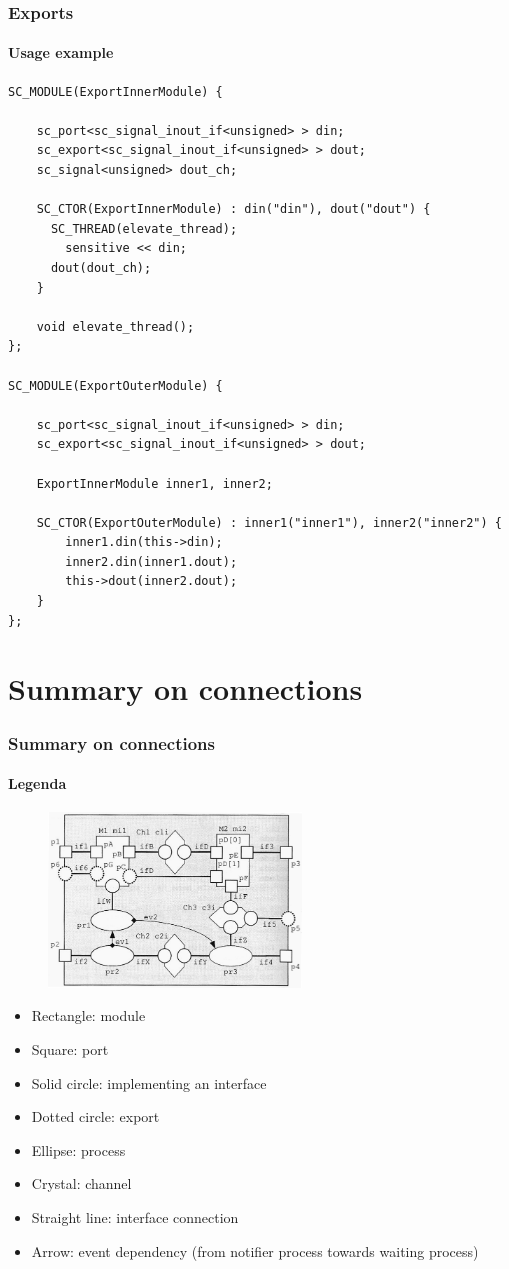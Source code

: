 \begin{frame}[fragile]
\frametitle{Exports}
\framesubtitle{Usage example}
{\tiny 
\begin{verbatim}
SC_MODULE(ExportInnerModule) {

    sc_port<sc_signal_inout_if<unsigned> > din;
    sc_export<sc_signal_inout_if<unsigned> > dout;
    sc_signal<unsigned> dout_ch;

    SC_CTOR(ExportInnerModule) : din("din"), dout("dout") {
      SC_THREAD(elevate_thread);
        sensitive << din;
      dout(dout_ch);
    }
    
    void elevate_thread();
};

SC_MODULE(ExportOuterModule) {

    sc_port<sc_signal_inout_if<unsigned> > din;
    sc_export<sc_signal_inout_if<unsigned> > dout;
    
    ExportInnerModule inner1, inner2;
    
    SC_CTOR(ExportOuterModule) : inner1("inner1"), inner2("inner2") {
        inner1.din(this->din);
        inner2.din(inner1.dout);
        this->dout(inner2.dout);
    }
};
\end{verbatim}
}
\end{frame}

\section{Summary on connections}

\begin{frame}
\frametitle{Summary on connections}
\framesubtitle{Legenda}

\begin{figure}
\includegraphics[width=0.6\textwidth]{lecture12/img/connections.png}
\end{figure}
{\scriptsize
\begin{itemize}
\item Rectangle: module
\item Square: port
\item Solid circle: implementing an interface
\item Dotted circle: export
\item Ellipse: process
\item Crystal: channel
\item Straight line: interface connection
\item Arrow: event dependency (from notifier process towards waiting process)
\end{itemize}
}
\end{frame}

